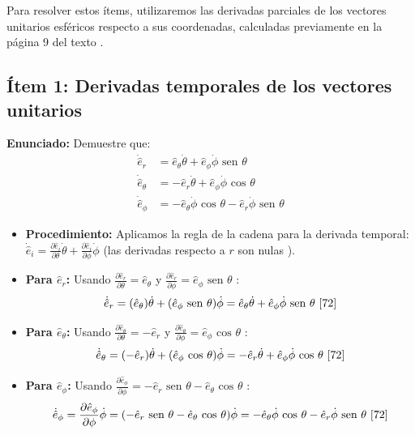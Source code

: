 \documentclass[a4paper]{article}
\begin{document}
Para resolver estos ítems, utilizaremos las derivadas parciales de los vectores unitarios esféricos respecto a sus coordenadas, calculadas previamente en la página 9 del texto \cite{50, 51}.

\subsection*{Ítem 1: Derivadas temporales de los vectores unitarios}
\textbf{Enunciado:} Demuestre que:
\begin{align*}
    \dot{\hat{e}}_r &= \hat{e}_\theta \dot{\theta} + \hat{e}_\phi \dot{\phi} \text{ sen } \theta \\
    \dot{\hat{e}}_\theta &= -\hat{e}_r \dot{\theta} + \hat{e}_\phi \dot{\phi} \text{ cos } \theta \\
    \dot{\hat{e}}_\phi &= -\hat{e}_\theta \dot{\phi} \text{ cos } \theta - \hat{e}_r \dot{\phi} \text{ sen } \theta
\end{align*}

\begin{itemize}
    \item \textbf{Procedimiento:} Aplicamos la regla de la cadena para la derivada temporal: $\dot{\hat{e}}_i = \frac{\partial \hat{e}_i}{\partial \theta}\dot{\theta} + \frac{\partial \hat{e}_i}{\partial \phi}\dot{\phi}$ (las derivadas respecto a $r$ son nulas \cite{50}).
    \item \textbf{Para $\hat{e}_r$:} Usando $\frac{\partial \hat{e}_r}{\partial \theta} = \hat{e}_\theta$ y $\frac{\partial \hat{e}_r}{\partial \phi} = \hat{e}_\phi \text{ sen } \theta$ \cite{50}:
    \begin{equation*}
        \dot{\hat{e}}_r = (\hat{e}_\theta) \dot{\theta} + (\hat{e}_\phi \text{ sen } \theta) \dot{\phi} = \hat{e}_\theta \dot{\theta} + \hat{e}_\phi \dot{\phi} \text{ sen } \theta \text{ \cite{72}}
    \end{equation*}
    \item \textbf{Para $\hat{e}_\theta$:} Usando $\frac{\partial \hat{e}_\theta}{\partial \theta} = -\hat{e}_r$ y $\frac{\partial \hat{e}_\theta}{\partial \phi} = \hat{e}_\phi \text{ cos } \theta$ \cite{50, 51}:
    \begin{equation*}
        \dot{\hat{e}}_\theta = (-\hat{e}_r) \dot{\theta} + (\hat{e}_\phi \text{ cos } \theta) \dot{\phi} = -\hat{e}_r \dot{\theta} + \hat{e}_\phi \dot{\phi} \text{ cos } \theta \text{ \cite{72}}
    \end{equation*}
    \item \textbf{Para $\hat{e}_\phi$:} Usando $\frac{\partial \hat{e}_\phi}{\partial \phi} = -\hat{e}_r \text{ sen } \theta - \hat{e}_\theta \text{ cos } \theta$ \cite{51}:
    \begin{equation*}
        \dot{\hat{e}}_\phi = \frac{\partial \hat{e}_\phi}{\partial \phi} \dot{\phi} = (-\hat{e}_r \text{ sen } \theta - \hat{e}_\theta \text{ cos } \theta) \dot{\phi} = -\hat{e}_\theta \dot{\phi} \text{ cos } \theta - \hat{e}_r \dot{\phi} \text{ sen } \theta \text{ \cite{72}}
    \end{equation*}
\end{itemize}
\end{document}
